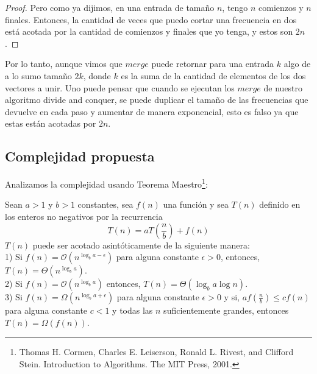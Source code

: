 \begin{proof}
Pero como ya dijimos, en una entrada de tamaño $n$, tengo $n$ comienzos y $n$ finales. Entonces, la cantidad de veces que puedo cortar una frecuencia en dos está acotada por la cantidad de comienzos y finales que yo tenga, y estos son $2n$.
\end{proof}



Por lo tanto, aunque vimos que $merge$ puede retornar para una entrada $k$ algo de a lo sumo tamaño $2k$, donde $k$ es la suma de la cantidad de elementos de los dos vectores a unir. Uno puede pensar que cuando se ejecutan los $merge$ de nuestro algoritmo divide and conquer, se puede duplicar el tamaño de las frecuencias que devuelve en cada paso y aumentar de manera exponencial, esto es falso ya que estas están acotadas por $2n$.

\subsection{Complejidad propuesta}

Analizamos la complejidad usando Teorema Maestro\footnote{Thomas H. Cormen, Charles E. Leiserson, Ronald L. Rivest, and Clifford Stein. Introduction to Algorithms. The MIT Press, 2001.}:

Sean $a > 1$ y $b > 1$ constantes, sea $f(n)$ una función y sea
$T(n)$ definido en los enteros no negativos por la
recurrencia
$$T(n)= aT(\frac{n}{b}) + f(n)$$
$T(n)$ puede ser acotado asintóticamente de la siguiente manera: \\

1) Si $f(n) = \mathcal{O}(n^{\log_b a-\epsilon})$ para alguna constante $\epsilon > 0$, entonces, $T(n) = \Theta (n^{\log_b a})$. \\

2) Si $f(n) = \mathcal{O}(n^{\log_b a})$ entonces, $T(n) = \Theta (\log_b a  \log n )$. \\

3) Si $f(n) = \Omega (n^{\log_b a + \epsilon})$ para alguna constante $\epsilon > 0$ y si,
$af(\frac{n}{b}) \leq cf(n)$ para alguna constante $c < 1$ y todas las $n$ suficientemente grandes, entonces $T(n) = \Omega (f(n))$. \\

